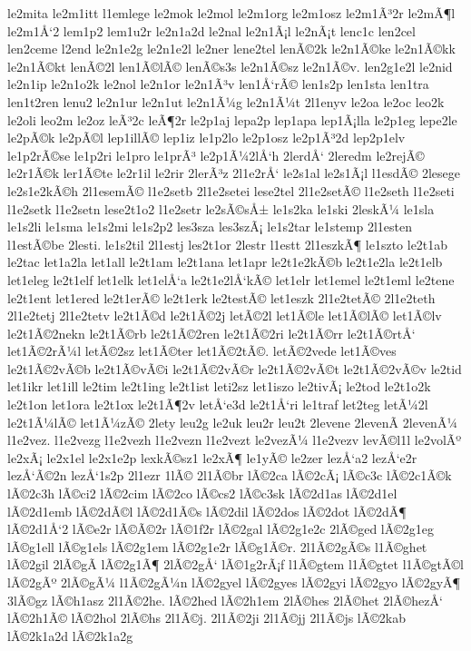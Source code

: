 {le2mita
le2m1itt
l1emlege
le2mok
le2mol
le2m1org
le2m1osz
le2m1Ã³2r
le2mÃ¶l
le2m1Å‘2
lem1p2
lem1u2r
le2n1a2d
le2nal
le2n1Ã¡l
le2nÃ¡t
lenc1c
len2cel
len2ceme
l2end
le2n1e2g
le2n1e2l
le2ner
lene2tel
lenÃ©2k
le2n1Ã©ke
le2n1Ã©kk
le2n1Ã©kt
lenÃ©2l
len1Ã©lÃ©
lenÃ©s3s
le2n1Ã©sz
le2n1Ã©v.
len2g1e2l
le2nid
le2n1ip
le2n1o2k
le2nol
le2n1or
le2n1Ã³v
len1Å‘rÃ©
len1s2p
len1sta
len1tra
len1t2ren
lenu2
le2n1ur
le2n1ut
le2n1Ã¼g
le2n1Ã¼t
2l1enyv
le2oa
le2oc
leo2k
le2oli
leo2m
le2oz
leÃ³2c
leÃ¶2r
le2p1aj
lepa2p
lep1apa
lep1Ã¡lla
le2p1eg
lepe2le
le2pÃ©k
le2pÃ©l
lep1illÃ©
lep1iz
le1p2lo
le2p1osz
le2p1Ã³2d
lep2p1elv
le1p2rÃ©se
le1p2ri
le1pro
le1prÃ³
le2p1Ã¼2lÅ‘h
2lerdÅ‘
2leredm
le2rejÃ©
le2r1Ã©k
ler1Ã©te
le2r1il
le2rir
2lerÃ³z
2l1e2rÅ‘
le2s1al
le2s1Ã¡l
l1esdÃ©
2lesege
le2s1e2kÃ©h
2l1esemÃ©
l1e2setb
2l1e2setei
lese2tel
2l1e2setÃ©
l1e2seth
l1e2seti
l1e2setk
l1e2setn
lese2t1o2
l1e2setr
le2sÃ©sÅ±
le1s2ka
le1ski
2leskÃ¼
le1sla
le1s2li
le1sma
le1s2mi
le1s2p2
les3sza
les3szÃ¡
le1s2tar
le1stemp
2l1esten
l1estÃ©be
2lesti.
le1s2til
2l1estj
les2t1or
2lestr
l1estt
2l1eszkÃ¶
le1szto
le2t1ab
le2tac
let1a2la
let1all
le2t1am
le2t1ana
let1apr
le2t1e2kÃ©b
le2t1e2la
le2t1elb
let1eleg
le2t1elf
let1elk
let1elÅ‘a
le2t1e2lÅ‘kÃ©
let1elr
let1emel
le2t1eml
le2tene
le2t1ent
let1ered
le2t1erÃ©
le2t1erk
le2testÃ©
let1eszk
2l1e2tetÃ©
2l1e2teth
2l1e2tetj
2l1e2tetv
le2t1Ã©d
le2t1Ã©2j
letÃ©2l
let1Ã©le
let1Ã©lÃ©
let1Ã©lv
le2t1Ã©2nekn
le2t1Ã©rb
le2t1Ã©2ren
le2t1Ã©2ri
le2t1Ã©rr
le2t1Ã©rtÅ‘
let1Ã©2rÃ¼l
letÃ©2sz
let1Ã©ter
let1Ã©2tÃ©.
letÃ©2vede
let1Ã©ves
le2t1Ã©2vÃ©b
le2t1Ã©vÃ©i
le2t1Ã©2vÃ©r
le2t1Ã©2vÃ©t
le2t1Ã©2vÃ©v
le2tid
let1ikr
let1ill
le2tim
le2t1ing
le2t1ist
leti2sz
let1iszo
le2tivÃ¡
le2tod
le2t1o2k
le2t1on
let1ora
le2t1ox
le2t1Ã¶2v
letÅ‘e3d
le2t1Å‘ri
le1traf
let2teg
letÃ¼2l
le2t1Ã¼lÃ©
let1Ã¼zÃ©
2lety
leu2g
le2uk
leu2r
leu2t
2levene
2levenÃ­
2levenÃ¼
l1e2vez.
l1e2vezg
l1e2vezh
l1e2vezn
l1e2vezt
le2vezÃ¼
l1e2vezv
levÃ©l1l
le2volÃº
le2xÃ¡
le2x1el
le2x1e2p
lexkÃ©sz1
le2xÃ¶
le1yÃ©
le2zer
lezÅ‘a2
lezÅ‘e2r
lezÅ‘Ã©2n
lezÅ‘1s2p
2l1ezr
1lÃ©
2l1Ã©br
lÃ©2ca
lÃ©2cÃ¡
lÃ©c3c
lÃ©2c1Ã©k
lÃ©2c3h
lÃ©ci2
lÃ©2cim
lÃ©2co
lÃ©cs2
lÃ©c3sk
lÃ©2d1as
lÃ©2d1el
lÃ©2d1emb
lÃ©2dÃ©l
lÃ©2d1Ã©s
lÃ©2dil
lÃ©2dos
lÃ©2dot
lÃ©2dÃ¶
lÃ©2d1Å‘2
lÃ©e2r
lÃ©Ã©2r
lÃ©1f2r
lÃ©2gal
lÃ©2g1e2c
2lÃ©ged
lÃ©2g1eg
lÃ©g1ell
lÃ©g1els
lÃ©2g1em
lÃ©2g1e2r
lÃ©g1Ã©r.
2l1Ã©2gÃ©s
l1Ã©ghet
lÃ©2gil
2lÃ©gÃ­
lÃ©2g1Ã¶
2lÃ©2gÅ‘
lÃ©1g2rÃ¡f
l1Ã©gtem
l1Ã©gtet
l1Ã©gtÃ©l
lÃ©2gÃº
2lÃ©gÃ¼
l1Ã©2gÃ¼n
lÃ©2gyel
lÃ©2gyes
lÃ©2gyi
lÃ©2gyo
lÃ©2gyÃ¶
3lÃ©gz
lÃ©h1asz
2l1Ã©2he.
lÃ©2hed
lÃ©2h1em
2lÃ©hes
2lÃ©het
2lÃ©hezÅ‘
lÃ©2h1Ã©
lÃ©2hol
2lÃ©hs
2l1Ã©j.
2l1Ã©2ji
2l1Ã©jj
2l1Ã©js
lÃ©2kab
lÃ©2k1a2d
lÃ©2k1a2g
}
